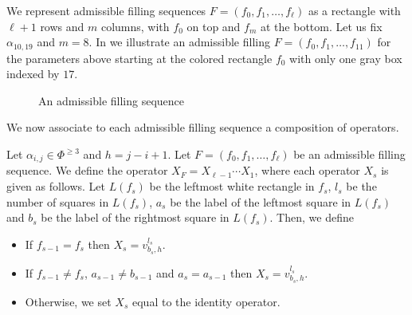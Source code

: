 \begin{example}\rm \label{exa: filling sequence}
We represent admissible filling sequences $F=(f_0,f_1,\ldots , f_\ell)$ as a rectangle with $\ell+1$ rows and $m$ columns, with $f_0$ on top and $f_m$ at the bottom. 
Let us fix $\alpha_{10,19}$ and $m=8$. 
In  we illustrate an admissible filling $F=(f_0,f_1, \ldots , f_{11})$ for the parameters above starting at the colored rectangle $f_0$ with only one gray box indexed by $17$. 
 
\begin{figure}[H]
\centering
\def\Cols{8}
\def\Rows{12}
\def\CellFill{gray!50}
\label{fig: 6-admissible filling sequences}
\caption{An admissible filling sequence}
\end{figure}
\end{example}

We now associate to each admissible filling sequence a composition of operators. 

\begin{definition}\rm \label{def: good pair weights}
Let $\alpha_{i,j}\in \Phi^{\geq 3}$ and  $h=j-i+1$. 
Let $F=(f_0,f_1,\ldots , f_{\ell})$ be an admissible filling sequence.
We define the operator $X_F=X_{\ell-1}\cdots X_{1}$, where each operator $X_s$ is given as follows.
Let $L(f_s)$ be the leftmost white rectangle in $f_s$, $l_s$ be the number of squares in $L(f_s)$, $a_s$  be the label of the leftmost square in $L(f_s)$ and $b_s$  be the label of the rightmost square in $L(f_s)$. 
Then, we define
\begin{itemize}
    \item If $f_{s-1}=f_{s}$ then $X_s = v_{b_s,h}^{l_s}$.
     \item If $f_{s-1}\neq f_{s}$, $ a_{s-1}\neq b_{s-1}$ and $a_s=a_{s-1}$ then $X_s= v_{b_s,h}^{l_s}$.
    \item Otherwise, we set $X_{s}$ equal to the identity operator.  
\end{itemize}
\end{definition}

